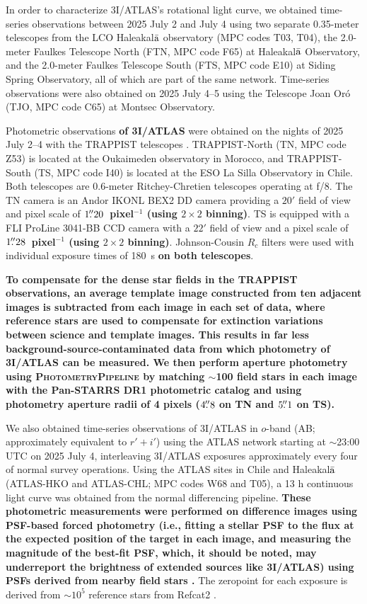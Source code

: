 \documentclass[linenumbers,twocolumn,longbib]{aastex7}
\begin{document}
In order to characterize 3I/ATLAS's rotational light curve, we obtained time-series observations between 2025 July 2 and July 4 using two separate 0.35-meter telescopes from the LCO Haleakal${\rm\bar{a}}$ observatory (MPC codes T03, T04), the 2.0-meter Faulkes Telescope North (FTN, MPC code F65) at Haleakal${\rm\bar{a}}$ Observatory, and the 2.0-meter Faulkes Telescope South (FTS, MPC code E10) at Siding Spring Observatory, all of which are part of the same network.  Time-series observations were also obtained on 2025 July 4--5 using the Telescope Joan Or\'{o} (TJO, MPC code C65) at Montsec Observatory.

Photometric observations \textbf{of 3I/ATLAS} were obtained on the nights of 2025 July 2--4 with the TRAPPIST telescopes \citep{jehin2011trappist}. TRAPPIST-North (TN, MPC code Z53) is located at the Oukaimeden observatory in Morocco, and TRAPPIST-South (TS, MPC code I40) is located at the ESO La Silla Observatory in Chile. Both telescopes are 0.6-meter Ritchey-Chretien telescopes operating at f/8. The TN camera is an Andor IKONL BEX2 DD camera providing a $20'$ field of view and pixel scale of \textbf{$1\mbox{$.\!\!^{\prime\prime}$}20$~pixel$^{-1}$ (using $2\times2$ binning)}. TS is equipped with a FLI ProLine 3041-BB CCD camera with a $22'$ field of view and a pixel scale of \textbf{$1\mbox{$.\!\!^{\prime\prime}$}28$~pixel$^{-1}$ (using $2\times2$ binning)}. Johnson-Cousin $R_c$ filters were used with individual exposure times of 180~s \textbf{on both telescopes}.

\textbf{To compensate for the dense star fields in the TRAPPIST observations, an average template image
constructed from ten adjacent images is subtracted from each image in each set of data, where reference
stars are used to compensate for extinction variations between science and template images. This results
in far less background-source-contaminated data from which photometry of 3I/ATLAS can be measured. We
then perform aperture photometry using \textsc{PhotometryPipeline} \citep{Mommert_2017} by matching
$\sim$100 field stars in each image with the Pan-STARRS DR1 photometric catalog and using photometry
aperture radii of 4 pixels ($4\mbox{$.\!\!^{\prime\prime}$}8$ on TN and $5\mbox{$.\!\!^{\prime\prime}$}1$ on TS).}

We also obtained time-series observations of 3I/ATLAS in $o$-band (AB; approximately equivalent to $r'+i'$) using the ATLAS network starting at $\sim$23:00 UTC on 2025 July 4, interleaving 3I/ATLAS exposures approximately every four of normal survey operations.  Using the ATLAS sites in Chile and Haleakal${\rm\bar{a}}$ (ATLAS-HKO and ATLAS-CHL; MPC codes W68 and T05), a 13 h continuous light curve was obtained from the normal differencing pipeline. \textbf{These photometric measurements were performed on difference images using PSF-based forced photometry (i.e., fitting a stellar PSF to the flux at the expected position of the target in each image, and measuring the magnitude of the best-fit PSF, which, it should be noted, may underreport the brightness of extended sources like 3I/ATLAS) using PSFs derived from nearby field stars \citep{Tonry2018a,smith2020_atlas}.} The zeropoint for each exposure is derived from $\sim10^5$ reference stars from Refcat2 \citep{Tonry2018b}.
\end{document}
